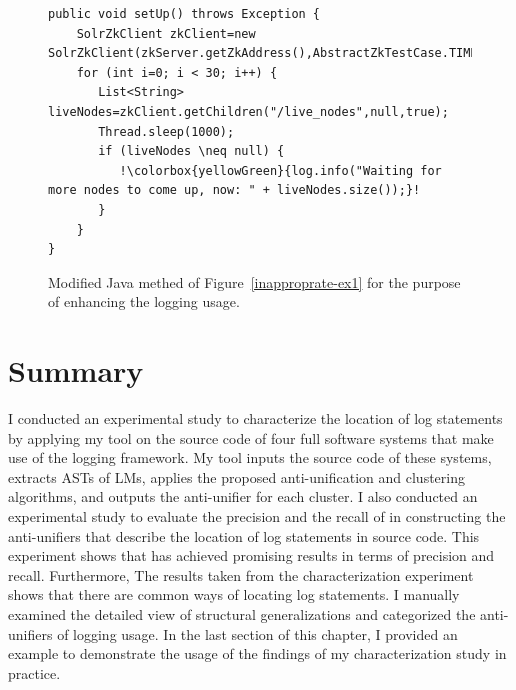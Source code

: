 \begin{figure}[p]
\def\baselinestretch{1}
\begin{lstlisting}[escapechar=!]
public void setUp() throws Exception {
    SolrZkClient zkClient=new SolrZkClient(zkServer.getZkAddress(),AbstractZkTestCase.TIMEOUT);
    for (int i=0; i < 30; i++) {
       List<String> liveNodes=zkClient.getChildren("/live_nodes",null,true);
       Thread.sleep(1000);
       if (liveNodes \neq null) {
          !\colorbox{yellowGreen}{log.info("Waiting for more nodes to come up, now: " + liveNodes.size());}! 
       }
    }
}
\end{lstlisting}
\caption[Example 1: An example  for the purpose of enhancing the logging usage in the Java method of Example.]{Modified Java methed of Figure~\ref{inapproprate-ex1} for the purpose of enhancing the logging usage.\label{approprate-ex1}}
\end{figure}



\section{Summary}
I conducted an experimental study to characterize the location of log statements by applying my tool on the source code of four full software systems that make use of the  logging framework. My tool inputs the source code of these systems, extracts ASTs of LMs, applies the proposed anti-unification and clustering algorithms, and outputs the anti-unifier for each cluster. I also conducted an experimental study to evaluate the precision and the recall of  in constructing the anti-unifiers that describe the location of log statements in source code. This experiment shows that  has achieved promising results in terms of precision and recall. Furthermore, The results taken from the characterization experiment shows that there are common ways of locating log statements. I manually examined the detailed view of structural generalizations and categorized the anti-unifiers of logging usage. In the last section of this chapter, I provided an example to demonstrate the usage of the findings of my characterization study in practice.




